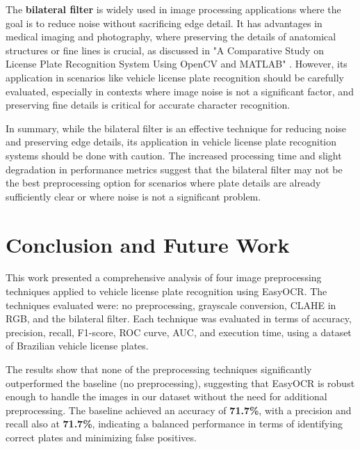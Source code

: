 \documentclass[conference]{IEEEtran}
\begin{document}
	The \textbf{bilateral filter} is widely used in image processing applications where the goal is to reduce noise without sacrificing edge detail. It has advantages in medical imaging and photography, where preserving the details of anatomical structures or fine lines is crucial, as discussed in "A Comparative Study on License Plate Recognition System Using OpenCV and MATLAB" \cite{b17}. However, its application in scenarios like vehicle license plate recognition should be carefully evaluated, especially in contexts where image noise is not a significant factor, and preserving fine details is critical for accurate character recognition.
	
	In summary, while the bilateral filter is an effective technique for reducing noise and preserving edge details, its application in vehicle license plate recognition systems should be done with caution. The increased processing time and slight degradation in performance metrics suggest that the bilateral filter may not be the best preprocessing option for scenarios where plate details are already sufficiently clear or where noise is not a significant problem.
	
	\section{Conclusion and Future Work}
	
	This work presented a comprehensive analysis of four image preprocessing techniques applied to vehicle license plate recognition using EasyOCR. The techniques evaluated were: no preprocessing, grayscale conversion, CLAHE in RGB, and the bilateral filter. Each technique was evaluated in terms of accuracy, precision, recall, F1-score, ROC curve, AUC, and execution time, using a dataset of Brazilian vehicle license plates.
	
	The results show that none of the preprocessing techniques significantly outperformed the baseline (no preprocessing), suggesting that EasyOCR is robust enough to handle the images in our dataset without the need for additional preprocessing. The baseline achieved an accuracy of \textbf{71.7\%}, with a precision and recall also at \textbf{71.7\%}, indicating a balanced performance in terms of identifying correct plates and minimizing false positives.
	
\end{document}
